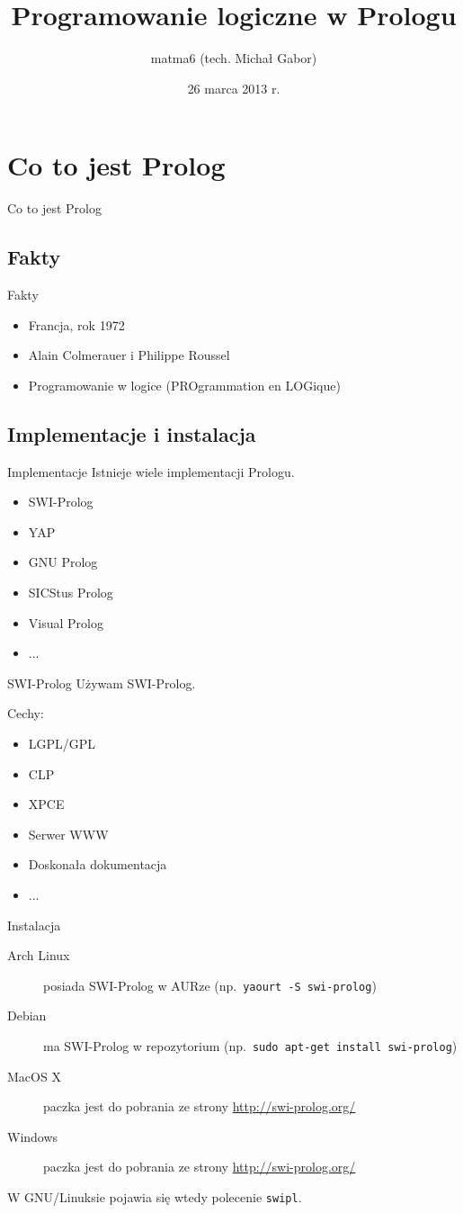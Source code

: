\documentclass[blue]{beamer}
\author{matma6 (tech. Michał Gabor)}
\title{Programowanie logiczne w Prologu}
\date{26 marca 2013 r.}
\newcommand{\tytul}[1]{\begin{frame}\begin{center}\begin{Huge}#1\end{Huge}\end{center}\end{frame}}
\begin{document}
\begin{frame}
\titlepage
\end{frame}
\begin{frame}
\tableofcontents
\end{frame}
\section{Co to jest Prolog}
\tytul{Co to jest Prolog}
\subsection{Fakty}
\begin{frame}{Fakty}
\begin{itemize}
\item Francja, rok 1972
\item Alain Colmerauer i Philippe Roussel
\item Programowanie w logice (PROgrammation en LOGique)
\end{itemize}
\end{frame}
\subsection{Implementacje i instalacja}
\begin{frame}{Implementacje}
Istnieje wiele implementacji Prologu.
\begin{itemize}
\item SWI-Prolog
\item YAP
\item GNU Prolog
\item SICStus Prolog
\item Visual Prolog
\item ...
\end{itemize}
\end{frame}
\begin{frame}{SWI-Prolog}
Używam SWI-Prolog.

Cechy:
\begin{itemize}
\item LGPL/GPL
\item CLP
\item XPCE
\item Serwer WWW
\item Doskonała dokumentacja
\item ...
\end{itemize}
\end{frame}
\begin{frame}[fragile]{Instalacja}
\begin{description}
\item[Arch Linux] posiada SWI-Prolog w AURze (np.~\verb+yaourt -S swi-prolog+)
\item[Debian] ma SWI-Prolog w repozytorium (np.~\verb+sudo apt-get install swi-prolog+)
\item[MacOS X] paczka jest do pobrania ze strony \url{http://swi-prolog.org/}
\item[Windows] paczka jest do pobrania ze strony \url{http://swi-prolog.org/}
\end{description}

W GNU/Linuksie pojawia się wtedy polecenie \verb+swipl+.
\end{frame}
\end{document}
